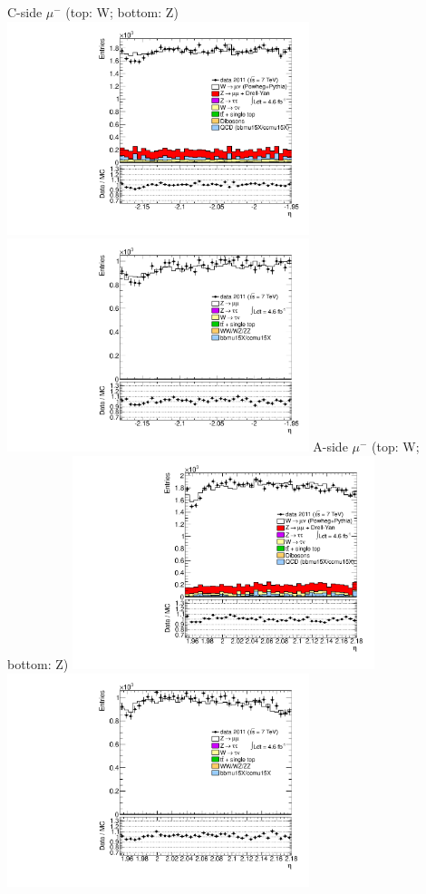  {
\colb[T]
C-side $\mu^{-}$ (top: W; bottom: Z)
\centering
\includegraphics[width=0.66\textwidth]{dates/20130306/figures/both/WpDtoH_10_C_stack_l_eta_NEG} \\
\includegraphics[width=0.66\textwidth]{dates/20130306/figures/both/Z_10_C_stack_lN_eta_ALL.pdf}
A-side $\mu^{-}$ (top: W; bottom: Z)
\centering
\includegraphics[width=0.66\textwidth]{dates/20130306/figures/both/WpDtoH_10_A_stack_l_eta_NEG} \\
\includegraphics[width=0.66\textwidth]{dates/20130306/figures/both/Z_10_A_stack_lN_eta_ALL.pdf} 
\cole
}
